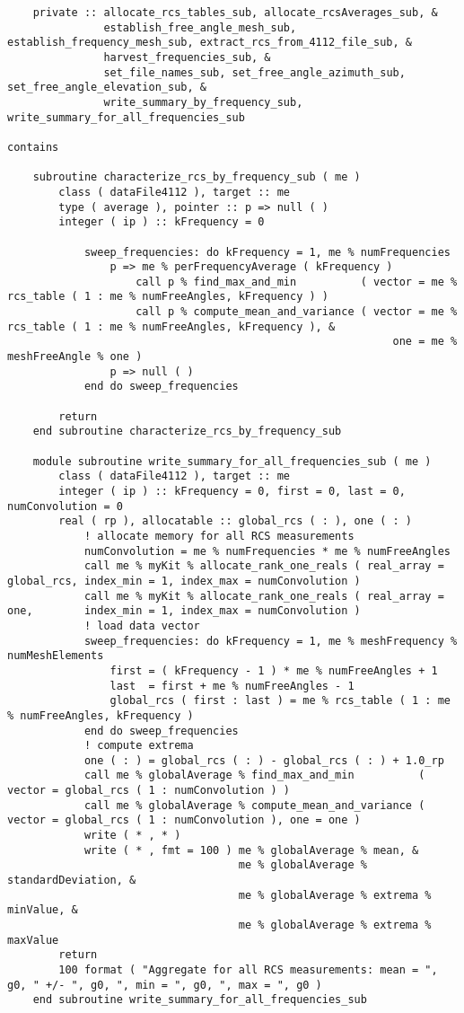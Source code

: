 {{\begin{lstlisting}
    private :: allocate_rcs_tables_sub, allocate_rcsAverages_sub, &
               establish_free_angle_mesh_sub, establish_frequency_mesh_sub, extract_rcs_from_4112_file_sub, &
               harvest_frequencies_sub, &
               set_file_names_sub, set_free_angle_azimuth_sub, set_free_angle_elevation_sub, &
               write_summary_by_frequency_sub, write_summary_for_all_frequencies_sub

contains

    subroutine characterize_rcs_by_frequency_sub ( me )
        class ( dataFile4112 ), target :: me
        type ( average ), pointer :: p => null ( )
        integer ( ip ) :: kFrequency = 0

            sweep_frequencies: do kFrequency = 1, me % numFrequencies
                p => me % perFrequencyAverage ( kFrequency )
                    call p % find_max_and_min          ( vector = me % rcs_table ( 1 : me % numFreeAngles, kFrequency ) )
                    call p % compute_mean_and_variance ( vector = me % rcs_table ( 1 : me % numFreeAngles, kFrequency ), &
                                                            one = me % meshFreeAngle % one )
                p => null ( )
            end do sweep_frequencies

        return
    end subroutine characterize_rcs_by_frequency_sub

    module subroutine write_summary_for_all_frequencies_sub ( me )
        class ( dataFile4112 ), target :: me
        integer ( ip ) :: kFrequency = 0, first = 0, last = 0, numConvolution = 0
        real ( rp ), allocatable :: global_rcs ( : ), one ( : )
            ! allocate memory for all RCS measurements
            numConvolution = me % numFrequencies * me % numFreeAngles
            call me % myKit % allocate_rank_one_reals ( real_array = global_rcs, index_min = 1, index_max = numConvolution )
            call me % myKit % allocate_rank_one_reals ( real_array = one,        index_min = 1, index_max = numConvolution )
            ! load data vector
            sweep_frequencies: do kFrequency = 1, me % meshFrequency % numMeshElements
                first = ( kFrequency - 1 ) * me % numFreeAngles + 1
                last  = first + me % numFreeAngles - 1
                global_rcs ( first : last ) = me % rcs_table ( 1 : me % numFreeAngles, kFrequency )
            end do sweep_frequencies
            ! compute extrema
            one ( : ) = global_rcs ( : ) - global_rcs ( : ) + 1.0_rp
            call me % globalAverage % find_max_and_min          ( vector = global_rcs ( 1 : numConvolution ) )
            call me % globalAverage % compute_mean_and_variance ( vector = global_rcs ( 1 : numConvolution ), one = one )
            write ( * , * )
            write ( * , fmt = 100 ) me % globalAverage % mean, &
                                    me % globalAverage % standardDeviation, &
                                    me % globalAverage % extrema % minValue, &
                                    me % globalAverage % extrema % maxValue
        return
        100 format ( "Aggregate for all RCS measurements: mean = ", g0, " +/- ", g0, ", min = ", g0, ", max = ", g0 )
    end subroutine write_summary_for_all_frequencies_sub


\end{lstlisting}}}
